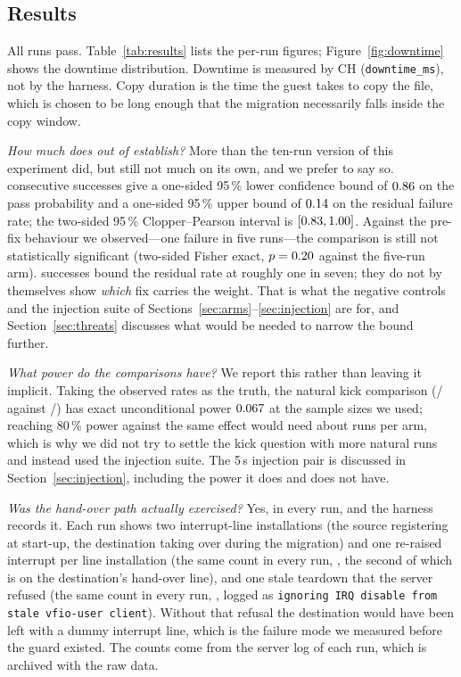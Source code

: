 \documentclass[10pt,conference]{IEEEtran}
\newcommand{\code}[1]{\texttt{#1}}
\begin{document}
\subsection{Results}
\label{sec:results}
All \TotalRuns{} runs pass. Table~\ref{tab:results} lists the per-run figures;
Figure~\ref{fig:downtime} shows the downtime distribution. Downtime is measured
by CH (\code{downtime\_ms}), not by the harness. Copy duration is the time the
guest takes to copy the file, which is chosen to be long enough that the
migration necessarily falls inside the copy window.

\emph{How much does \PassCount{} out of \TotalRuns{} establish?} More than the
ten-run version of this experiment did, but still not much on its own, and we
prefer to say so. \TotalRuns{} consecutive successes give a one-sided 95\,\%
lower confidence bound of $0.86$ on the pass probability and a
one-sided 95\,\% upper bound of $0.14$ on the residual failure rate; the
two-sided 95\,\% Clopper--Pearson interval is $[0.83, 1.00]$. Against the
pre-fix behaviour we observed---one failure in five runs---the comparison is
still not statistically significant (two-sided Fisher exact, $p=0.20$ against the
five-run arm). \TotalRuns{} successes bound the residual rate at roughly one in
seven; they do not by themselves show \emph{which} fix carries the weight. That
is what the negative controls and the injection suite of
Sections~\ref{sec:arms}--\ref{sec:injection} are for, and
Section~\ref{sec:threats} discusses what would be needed to narrow the bound
further.

\emph{What power do the comparisons have?} We report this rather than leaving it
implicit. Taking the observed rates as the truth, the natural kick comparison
(\KickOffPass/\KickOffRuns{} against \PassCount/\TotalRuns) has exact
unconditional power $0.067$ at the sample sizes we used; reaching
80\,\% power against the same effect would need about \NKickForEighty{} runs per
arm, which is why we did not try to settle the kick question with more natural
runs and instead used the injection suite. The 5\,s injection pair is discussed
in Section~\ref{sec:injection}, including the power it does and does not have.

\emph{Was the hand-over path actually exercised?} Yes, in every run, and the
harness records it. Each run shows two interrupt-line installations (the source
registering at start-up, the destination taking over during the migration) and
one re-raised interrupt per line installation (the same count in every run,
\KickMin{}, the second of which is on the destination's hand-over line), and one
stale teardown that the
server refused (the same count in every run, \StaleMin{}, logged as
\code{ignoring IRQ disable from stale vfio-user client}). Without that refusal
the destination would have been left with a dummy interrupt line, which is the
failure mode we measured before the guard existed. The counts come from the
server log of each run, which is archived with the raw data.
\end{document}
